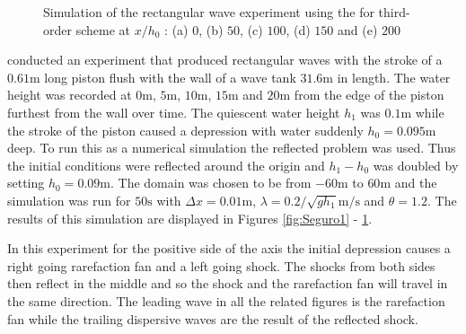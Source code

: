 \documentclass[SingleSpace,12pt]{Serre_ASCE}
\begin{document}
\begin{figure}[htb]
\caption{Simulation of the rectangular wave experiment using the for third-order scheme at $x/h_0$ : (a) $0$, (b) $50$, (c) $100$, (d) $150$ and (e) $200$}
\label{fig:Seguro3}
\end{figure}
 conducted an experiment that produced rectangular waves with the stroke of a $0.61\text{m}$ long piston flush with the wall of a wave tank $31.6\text{m}$ in length. The water height was recorded at $0\text{m}$, $5\text{m}$, $10\text{m}$, $15\text{m}$ and $20\text{m}$ from the edge of the piston furthest from the wall over time. The quiescent water height $h_1$ was $0.1\text{m}$ while the stroke of the piston caused a depression with water suddenly $h_0 = 0.095\text{m}$ deep. To run this as a numerical simulation the reflected problem was used. Thus the initial conditions were reflected around the origin and $h_1 - h_0$ was doubled by setting $h_0 = 0.09\text{m}$. The domain was chosen to be from $-60\text{m}$ to $60\text{m}$ and the simulation was run for $50\text{s}$ with $\Delta x = 0.01 \text{m}$, $\lambda = 0.2/\sqrt{g h_1} \text{m/s}$ and $\theta = 1.2$. The results of this simulation are displayed in Figures \ref{fig:Seguro1} - \ref{fig:Seguro3}.

In this experiment for the positive side of the axis the initial depression causes a right going rarefaction fan and a left going shock. The shocks from both sides then reflect in the middle and so the shock and the rarefaction fan will travel in the same direction. The leading wave in all the related figures is the rarefaction fan while the trailing dispersive waves are the result of the reflected shock.  
\end{document}
